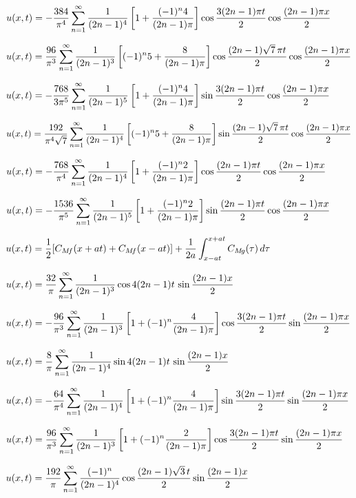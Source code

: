$u(x,t)=-\displaystyle\frac{384}{\pi^4}\sum_{n=1}^\infty\frac{1}{(2n-1)^4}\left[
1+\frac{(-1)^n4}{(2n-1)\pi}\right]\cos\frac{3(2n-1)\pi t}{2}\cos\frac{(2n-1)\pi
x}{2}$

$u(x,t)=\displaystyle\frac{96}{\pi^3}\sum_{n=1}^\infty\frac{1}{(2n-1)^3}\left[
(-1)^n5+\frac{8}{(2n-1)\pi}\right]\cos\frac{(2n-1)\sqrt7\,\pi
t}{2}\cos\frac{(2n-1)\pi x}{2}$


$u(x,t)=-\displaystyle\frac{768}{3\pi^5}\sum_{n=1}^\infty\frac{1}{(2n-1)^5}\left[
1+\frac{(-1)^n4}{(2n-1)\pi}\right]\sin\frac{3(2n-1)\pi t}{2}\cos\frac{(2n-1)\pi
x}{2}$

$u(x,t)=\displaystyle\frac{192}{\pi^4\sqrt7}\sum_{n=1}^\infty\frac{1}{(2n-1)^4}\left[
(-1)^n5+\frac{8}{(2n-1)\pi}\right]\sin\frac{(2n-1)\sqrt7\,\pi
t}{2}\cos\frac{(2n-1)\pi x}{2}$

$u(x,t)=-\displaystyle\frac{768}{\pi^4}\sum_{n=1}^\infty\frac{1}{(2n-1)^4}\left[
1+\frac{(-1)^n2}{(2n-1)\pi}\right]\cos\frac{(2n-1)\pi t}{2}\cos\frac{(2n-1)\pi
x}{2}$

$u(x,t)=-\displaystyle\frac{1536}{\pi^5}\sum_{n=1}^\infty\frac{1}{(2n-1)^5}\left[
1+\frac{(-1)^n2}{(2n-1)\pi}\right]\sin\frac{(2n-1)\pi t}{2}\cos\frac{(2n-1)\pi
x}{2}$

$u(x,t)=\displaystyle\frac{1}{2}[C_{M\!f}(x+at)+C_{M\!f}(x-at)]+
\frac{1}{2a}\int_{x-at}^{x+at}C_{M\!g}(\tau)\,d\tau$


$u(x,t)=\displaystyle
\frac{32}{\pi}\sum_{n=1}^\infty\frac{1}{(2n-1)^3}\cos4(2n-1)t\,\sin\frac{(2n-1)x}{2}$

$u(x,t)
=\displaystyle-\frac{96}{\pi^3}\sum_{n=1}^\infty
\frac{1}{(2n-1)^3}\left[1+(-1)^n\frac{4}{(2n-1)\pi}\right]
\cos\frac{3(2n-1)\pi t}{2}\sin\frac{(2n-1)\pi x}{2}$

$u(x,t)=\displaystyle
\frac{8}{\pi}\sum_{n=1}^\infty\frac{1}{(2n-1)^4}\sin4(2n-1)t\,\sin\frac{(2n-1)x}{2}$



$u(x,t)
=\displaystyle-\frac{64}{\pi^4}\sum_{n=1}^\infty
\frac{1}{(2n-1)^4}\left[1+(-1)^n\frac{4}{(2n-1)\pi}\right]
\sin\frac{3(2n-1)\pi t}{2}\sin\frac{(2n-1)\pi x}{2}$

$u(x,t)
=\displaystyle\frac{96}{\pi^3}\sum_{n=1}^\infty
\frac{1}{(2n-1)^3}\left[1+(-1)^n\frac{2}{(2n-1)\pi}\right]
\cos\frac{3(2n-1)\pi t}{2}
\sin\frac{(2n-1)\pi x}{2}$


$u(x,t)=\displaystyle\frac{192}{\pi}\sum_{n=1}^\infty\frac{(-1)^n}{(2n-1)^4}
\cos\frac{(2n-1)\sqrt3\,t}{2}\sin\frac{(2n-1) x}{2}$

